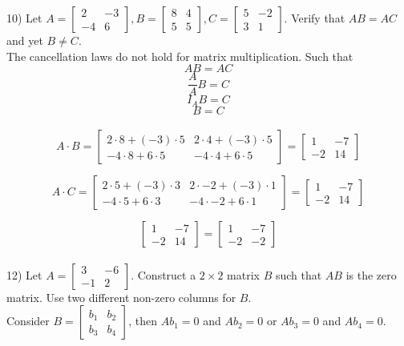 \documentclass[a4paper]{article}
\begin{document}
10) Let $A =
\begin{bmatrix}
2&-3\\
-4&6
\end{bmatrix},
B = 
\begin{bmatrix}
8&4\\
5&5
\end{bmatrix},
C =
\begin{bmatrix}
5&-2\\
3&1
\end{bmatrix}$. Verify that $AB = AC$ and yet $B \neq C$.\\

The cancellation laws do not hold for matrix multiplication. Such that $$AB=AC$$ $$\frac{A}{A}B = C$$ $$I_AB = C$$ $$B = C$$\\
\[A \cdot B =
\begin{bmatrix}
2\cdot8+(-3)\cdot5&2\cdot4+(-3)\cdot5\\
-4\cdot8+6\cdot5&-4\cdot4+6\cdot5
\end{bmatrix} =
\begin{bmatrix}
1&-7\\
-2&14
\end{bmatrix}
\]

\[A \cdot C =
\begin{bmatrix}
2\cdot5+(-3)\cdot3&2\cdot-2+(-3)\cdot1\\
-4\cdot5+6\cdot3&-4\cdot-2+6\cdot1
\end{bmatrix} =
\begin{bmatrix}
1&-7\\
-2&14
\end{bmatrix}
\]

\[
\begin{bmatrix}
1&-7\\
-2&14
\end{bmatrix} =
\begin{bmatrix}
1&-7\\
-2&-2
\end{bmatrix}
\]\\

12) Let $A = 
\begin{bmatrix}
3&-6\\
-1&2
\end{bmatrix}$. Construct a $2\times2$ matrix $B$ such that $AB$ is the zero matrix. Use two different non-zero columns for $B$.\\

Consider $B = \begin{bmatrix}
b_1&b_2\\
b_3&b_4
\end{bmatrix}$, then $Ab_1 = 0$ and $Ab_2 = 0$ or $Ab_3 = 0$ and $Ab_4 = 0$.
\end{document}
